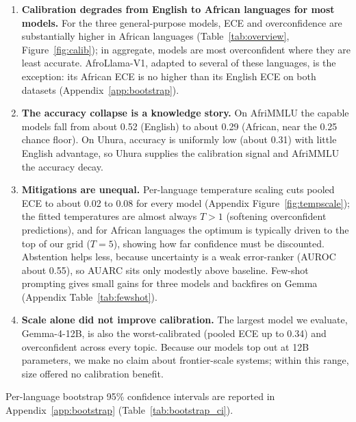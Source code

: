 \documentclass[pmlr]{jmlr}%
\begin{document}
\begin{enumerate}\itemsep2pt
  \item \textbf{Calibration degrades from English to African languages for most models.} For the three
  general-purpose models, ECE and overconfidence are substantially higher in African languages
  (Table~\ref{tab:overview}, Figure~\ref{fig:calib}); in aggregate, models are most overconfident
  where they are least accurate. AfroLlama-V1, adapted to several of these languages, is the exception:
  its African ECE is no higher than its English ECE on both datasets (Appendix~\ref{app:bootstrap}).
  \item \textbf{The accuracy collapse is a knowledge story.} On AfriMMLU the capable models fall from
  about 0.52 (English) to about 0.29 (African, near the 0.25 chance floor). On Uhura, accuracy is
  uniformly low (about 0.31) with little English advantage, so Uhura supplies the calibration signal
  and AfriMMLU the accuracy decay.
  \item \textbf{Mitigations are unequal.} Per-language temperature scaling cuts pooled ECE to about
  0.02 to 0.08 for every model (Appendix Figure~\ref{fig:tempscale}); the fitted temperatures are
  almost always $T>1$ (softening overconfident predictions), and for African languages the optimum is
  typically driven to the top of our grid ($T=5$), showing how far confidence must be discounted.
  Abstention helps less, because
  uncertainty is a weak error-ranker (AUROC about 0.55), so AUARC sits only modestly above baseline.
  Few-shot prompting gives small gains for three models and backfires on Gemma (Appendix
  Table~\ref{tab:fewshot}).
  \item \textbf{Scale alone did not improve calibration.} The largest model we evaluate, Gemma-4-12B,
  is also the worst-calibrated (pooled ECE up to 0.34) and overconfident across every topic. Because
  our models top out at 12B parameters, we make no claim about frontier-scale systems; within this
  range, size offered no calibration benefit.
\end{enumerate}

Per-language bootstrap 95\% confidence intervals are reported in Appendix~\ref{app:bootstrap}
(Table~\ref{tab:bootstrap_ci}).
\end{document}
